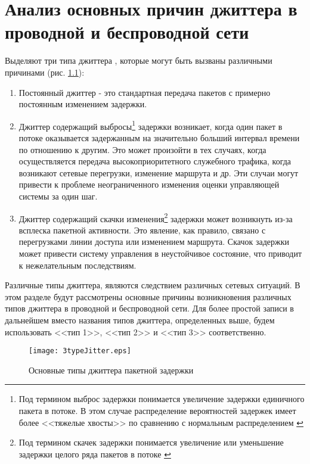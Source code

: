 \chapter{Анализ основных причин джиттера в проводной и беспроводной сети} \label{chapt2}
Выделяют три типа джиттера \cite{clark}, которые могут быть вызваны различными причинами (рис. \ref{img:3typeJitter}):
\begin{enumerate}
  \item Постоянный джиттер - это стандартная передача пакетов с примерно постоянным изменением задержки.
  \item Джиттер содержащий выбросы\footnote{Под термином выброс задержки понимается увеличение задержки единичного пакета в потоке. В этом случае распределение вероятностей задержек имеет более <<тяжелые хвосты>>  по сравнению с нормальным распределением \cite{Klekis} } задержки возникает, когда один пакет в потоке оказывается задержанным на значительно больший интервал времени по отношению к другим. Это может произойти в тех случаях, когда осуществляется передача высокоприоритетного служебного трафика, когда возникают сетевые перегрузки, изменение маршрута и др. Эти случаи могут привести к проблеме неограниченного изменения оценки управляющей системы за один шаг.
  \item Джиттер содержащий скачки изменения\footnote{Под термином скачек задержки понимается увеличение или уменьшение задержки целого ряда пакетов в потоке \cite{clark} } задержки может возникнуть из-за всплеска пакетной активности. Это явление, как правило, связано с перегрузками линии доступа или изменением маршрута. Скачок задержки может привести систему управления в неустойчивое состояние, что приводит к нежелательным последствиям.
\end{enumerate}


Различные типы джиттера, являются следствием различных сетевых ситуаций. В этом разделе будут рассмотрены основные причины возникновения различных типов джиттера в проводной и беспроводной сети. Для более простой записи в дальнейшем вместо названия типов джиттера, определенных выше, будем использовать <<тип 1>>, <<тип 2>> и <<тип 3>> соответственно.

\begin{figure} [!h] 
  \center
\texttt{[image: 3typeJitter.eps]}
  \caption{Основные типы джиттера пакетной задержки} 
  \label{img:3typeJitter}  
\end{figure}


